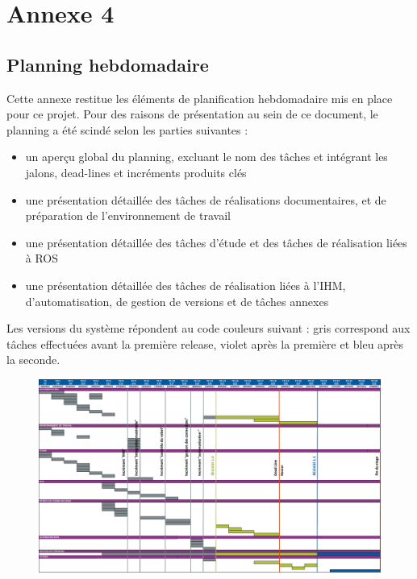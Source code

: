 \chapter*{Annexe 4}
\label{annexe:planning}

\makeatletter
\renewcommand{\thesection}{\@arabic\c@section}
\makeatother

\setcounter{section}{0}

\section{Planning hebdomadaire}

Cette annexe restitue les éléments de planification hebdomadaire mis en place pour ce projet. 
Pour des raisons de présentation au sein de ce document, le planning a été scindé selon les parties suivantes : 

\begin{itemize}
 \item un aperçu global du planning, excluant le nom des tâches et intégrant les jalons, dead-lines et incréments produits clés 
 \item une présentation détaillée des tâches de réalisations documentaires, et de préparation de l'environnement de travail
 \item une présentation détaillée des tâches d'étude et des tâches de réalisation liées à ROS
 \item une présentation détaillée des tâches de réalisation liées à l'IHM, d'automatisation, de gestion de versions et de tâches annexes 
\end{itemize}

Les versions du système répondent au code couleurs suivant : gris correspond aux tâches effectuées avant la première release, violet après la première et bleu après la seconde. 

\begin{figure}
\centering
    \includegraphics[width=1.\linewidth]{figures/planning-overview}  
  \label{fig:planning-overview}
\end{figure}

